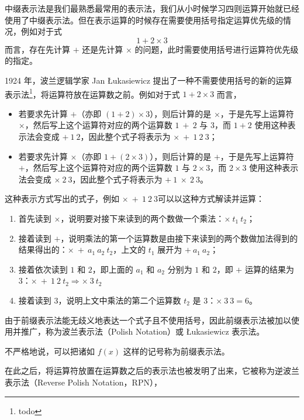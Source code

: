         中缀表示法是我们最熟悉最常用的表示法，我们从小时候学习四则运算开始就已经使用了中缀表示法。但在表示运算的时候存在需要使用括号指定运算优先级的情况，例如对于式 \[1 + 2 \times 3\] 而言，存在先计算 $+$ 还是先计算 $\times$ 的问题，此时需要使用括号进行运算符优先级的指定。

        1924 年，波兰逻辑学家 Jan {\L}ukasiewicz 提出了一种不需要使用括号的新的运算表示法\footnote{todo}，将运算符放在运算数之前。例如对于式 $1 + 2 \times 3$ 而言，
        \begin{itemize}
            \item 若要求先计算 $+$（亦即 $(1 + 2) \times 3$），则后计算的是 $\times$，于是先写上运算符 $\times$，然后写上这个运算符对应的两个运算数 $1\ +\ 2$ 与 $3$，而 $1 + 2$ 使用这种表示法会变成 $+\ 1\ 2$，因此整个式子将表示为 $\times\ +\ 1\ 2\ 3$；
            \item 若要求先计算 $\times$（亦即 $1 + (2 \times 3)$），则后计算的是 $+$，于是先写上运算符 $+$，然后写上这个运算符对应的两个运算数 $1$ 与 $2 \times 3$，而 $2 \times 3$ 使用这种表示法会变成 $\times\ 2\ 3$，因此整个式子将表示为 $+\ 1\ \times\ 2\ 3$。
        \end{itemize}
        这种表示方式写出的式子，例如 $\times\ +\ 1\ 2\ 3$可以以这种方式解读并运算：
        \begin{enumerate}
            \item 首先读到 $\times$，说明要对接下来读到的两个数做一个乘法：$\times\ t_1\ t_2$；
            \item 接着读到 $+$，说明乘法的第一个运算数是由接下来读到的两个数做加法得到的结果得出的：$\times\ +\ a_1\ a_2\ t_2$，上文的 $t_1$ 展开为 $+\ a_1\ a_2$；
            \item 接着依次读到 $1$ 和 $2$，即上面的 $a_1$ 和 $a_2$ 分别为 $1$ 和 $2$，即 $+$ 运算的结果为 $3$：$\times\ +\ 1\ 2\ t_2 \Rightarrow \times\ 3\ t_2$
            \item 接着读到 $3$，说明上文中乘法的第二个运算数 $t_2$ 是 $3$：$\times\ 3\ 3 = 6$。
        \end{enumerate}

        由于前缀表示法能无歧义地表达一个式子且不使用括号，因此前缀表示法被加以使用并推广，称为波兰表示法（Polish Notation）或 {\L}ukasiewicz 表示法。

        不严格地说，可以把诸如 $f(x)$ 这样的记号称为前缀表示法。

        在此之后，将运算符放置在运算数之后的表示法也被发明了出来，它被称为逆波兰表示法（Reverse Polish Notation，RPN），
